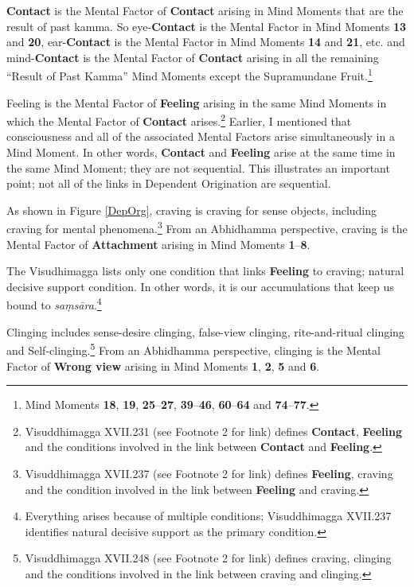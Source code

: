 \textbf{Contact} is the Mental Factor of \textbf{Contact} arising in Mind Moments that are the result of past kamma. So eye-\textbf{Contact} is the Mental Factor in Mind Moments \textbf{13} and \textbf{20}, ear-\textbf{Contact} is the Mental Factor in Mind Moments \textbf{14} and \textbf{21}, etc. and mind-\textbf{Contact} is the Mental Factor of \textbf{Contact} arising in all the remaining “Result of Past Kamma” Mind Moments except the Supramundane Fruit.\footnote{Mind Moments \textbf{18}, \textbf{19}, \textbf{25}--\textbf{27}, \textbf{39}--\textbf{46}, \textbf{60}--\textbf{64} and \textbf{74}--\textbf{77}.}

Feeling is the Mental Factor of \textbf{Feeling} arising in the same Mind Moments in which the Mental Factor of \textbf{Contact} arises.\footnote{Visuddhimagga XVII.231 (see Footnote 2 for link) defines \textbf{Contact}, \textbf{Feeling} and the conditions involved in the link between \textbf{Contact} and \textbf{Feeling}.} Earlier, I mentioned that consciousness and all of the associated Mental Factors arise simultaneously in a Mind Moment. In other words, \textbf{Contact} and \textbf{Feeling} arise at the same time in the same Mind Moment; they are not sequential. This illustrates an important point; not all of the links in Dependent Origination are sequential.

\pagebreak

As shown in Figure \ref{DepOrg}, craving is craving for sense objects, including craving for mental phenomena.\footnote{Visuddhimagga XVII.237 (see Footnote 2 for link) defines \textbf{Feeling}, craving and the condition involved in the link between \textbf{Feeling} and craving.} From an Abhidhamma perspective, craving is the Mental Factor of \textbf{Attachment} arising in Mind Moments \textbf{1}--\textbf{8}.

The Visudhimagga lists only one condition that links \textbf{Feeling} to craving; natural decisive support condition. In other words, it is our accumulations that keep us bound to \textit{saṃsāra}.\footnote{Everything arises because of multiple conditions; Visuddhimagga XVII.237 identifies natural decisive support as the primary condition.}

Clinging includes sense-desire clinging, false-view clinging, rite-and-ritual clinging and Self-clinging.\footnote{Visuddhimagga XVII.248 (see Footnote 2 for link) defines craving, clinging and the conditions involved in the link between craving and clinging.} From an Abhidhamma perspective, clinging is the Mental Factor of \textbf{Wrong view} arising in Mind Moments \textbf{1}, \textbf{2}, \textbf{5} and \textbf{6}.

